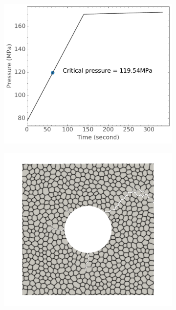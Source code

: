 \begin{figure}[htb!]
  \begin{subfigure}[t]{0.3\linewidth}
    \centering
    \includegraphics[width=\linewidth]{Chapter3/figures/bubble_pressure_r0.5_ext30_rod196}
    \caption{}
  \end{subfigure}
  \begin{subfigure}[t]{0.3\linewidth}
    \centering
    \includegraphics[width=\linewidth]{Chapter3/figures/r5_ext30}
    \caption{}
  \end{subfigure}

\end{figure}
